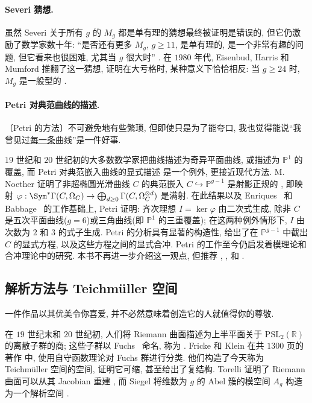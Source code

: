 \paragraph*{Severi 猜想.} 虽然 Severi 关于所有 $g$ 的 $M_g$ 都是单有理的猜想最终被证明是错误的, 但它仍激励了数学家数十年: ``是否还有更多 $M_g$, $g\geq11$, 是单有理的, 是一个非常有趣的问题, 但它看来也很困难, 尤其当 $g$ 很大时'' \cite[第 $37$ 页]{Mum75a}. 在 $1980$ 年代, Eisenbud, Harris 和 Mumford 推翻了这一猜想, 证明在大亏格时, 某种意义下恰恰相反: 当 $g\geq24$ 时, $M_g$ 是一般型的 \cite{HM82,EH87}.

\paragraph*{Petri 对典范曲线的描述.}
\begin{epigraph}
〔Petri 的方法〕不可避免地有些繁琐, 但即使只是为了能夸口, 我也觉得能说``我曾见过\underline{每一条}曲线''是一件好事.
\end{epigraph}
$19$ 世纪和 $20$ 世纪初的大多数数学家把曲线描述为奇异平面曲线, 或描述为 $\mathbb P^1$ 的覆盖, 而 Petri 对典范嵌入曲线的显式描述 \cite{Pet23} 是一个例外, 更接近现代方法. M. Noether 证明了非超椭圆光滑曲线 $C$ 的典范嵌入 $C\hookrightarrow\mathbb P^{g-1}$ 是射影正规的 \cite{Noe80}, 即映射 $\varphi:\Sym^*\Gamma(C,\Omega_C)\to\bigoplus_{d\geq0}\Gamma(C,\Omega_C^{\otimes d})$ 是满射. 在此结果以及 Enriques~\cite{Enr19} 和 Babbage~\cite{Bab39} 的工作基础上, Petri 证明: 齐次理想 $I=\ker\varphi$ 由二次式生成, 除非 $C$ 是五次平面曲线($g=6$)或三角曲线(即 $\mathbb P^1$ 的三重覆盖); 在这两种例外情形下, $I$ 由次数为 $2$ 和 $3$ 的式子生成. Petri 的分析具有显著的构造性, 给出了在 $\mathbb P^{g-1}$ 中截出 $C$ 的显式方程, 以及这些方程之间的显式合冲. Petri 的工作至今仍启发着模理论和合冲理论中的研究. 本书不再进一步介绍这一观点, 但推荐 \cite{SD73}, \cite[第 $17$--$21$ 页]{Mum75a}, \cite{AS78,Gre82,Gre84} 和 \cite[\S III.$3$]{ACGH85}.

\subsection{解析方法与 Teichmüller 空间}\label{src:1.1.3-subsection}
\begin{epigraph}
一件作品以其优美令你喜爱, 并不必然意味着创造它的人就值得你的尊敬.
\end{epigraph}
在 $19$ 世纪末和 $20$ 世纪初, 人们将 Riemann 曲面描述为上半平面关于 $\mathrm{PSL}_2(\mathbb R)$ 的离散子群的商; 这些子群以 Fuchs~\cite{Fuc66} 命名, 称为 . Fricke 和 Klein 在共 $1300$ 页的著作 \cite{FK92,FK12} 中, 使用自守函数理论对 Fuchs 群进行分类. 他们构造了今天称为 Teichmüller 空间的空间, 证明它可缩, 甚至给出了复结构. Torelli 证明了 Riemann 曲面可以从其 Jacobian 重建 \cite{Tor13}, 而 Siegel 将维数为 $g$ 的 Abel 簇的模空间 $A_g$ 构造为一个解析空间 \cite{Sie35}.

